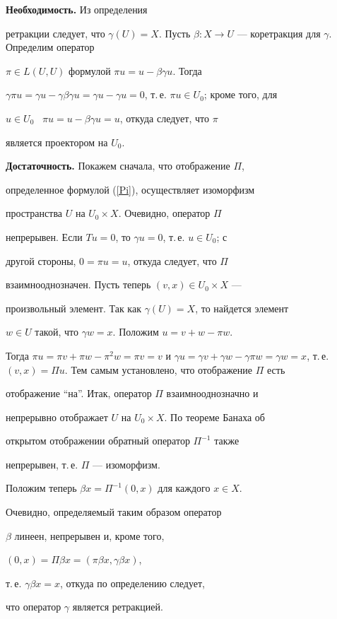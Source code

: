 \begin{pf}


{\bf Необходимость.} Из определения


ретракции следует, что $\gamma(U)=X$. Пусть $\beta : X


\to U$ --- коретракция для $\gamma$. Определим оператор


$\pi \in L(U, U)$ формулой $ \pi u=u - \beta \gamma u$. Тогда


$\gamma \pi u=\gamma u - \gamma \beta \gamma


u=\gamma u - \gamma u=0$, т.\,е. $\pi u \in U_0$; кроме того, для


$u \in U_0$ \ $ \pi u=u - \beta \gamma u=u$, откуда следует, что $\pi$


является проектором на $U_0$.


\smallskip





{\bf Достаточность.} Покажем сначала, что отображение $\Pi$,


определенное формулой (\ref{Pi}), осуществляет изоморфизм


пространства $U$ на $U_0 \times X$. Очевидно, оператор $\Pi$


непрерывен. Если $Tu=0$, то $\gamma u=0$, т.\,е. $u \in U_0$; с


другой стороны, $0=\pi u=u$, откуда следует, что $\Pi$


взаимнооднозначен. Пусть теперь $(v, x) \in U_0 \times X$ ---


произвольный элемент. Так как $\gamma(U)=X$, то найдется элемент


$w \in U$ такой, что $\gamma w=x$. Положим $ u=v+w - \pi w$.


Тогда $\pi u=\pi v+\pi w - \pi^2 w=\pi v=v$ и $ \gamma


u=\gamma v+\gamma w - \gamma \pi w=\gamma w=x$, т.\,е. $(v,


x)=\Pi u$. Тем самым установлено, что отображение $\Pi$ есть


отображение ``на''. Итак, оператор $\Pi$ взаимнооднозначно и


непрерывно отображает $U$ на $U_0 \times X$. По теореме Банаха об


открытом отображении обратный оператор $\Pi^{-1}$ также


непрерывен, т.\,е. $\Pi$ --- изоморфизм.





Положим теперь $\beta x=\Pi^{-1} (0,x)$ для каждого $x \in X$.


Очевидно, определяемый таким образом оператор


$\beta$ линеен, непрерывен и, кроме того,


$(0, x)=\Pi \beta x=(\pi \beta x, \gamma \beta x)$,


т.\,е. $\gamma \beta x=x$, откуда по определению следует,


что оператор $\gamma$ является ретракцией.


\end{pf}





